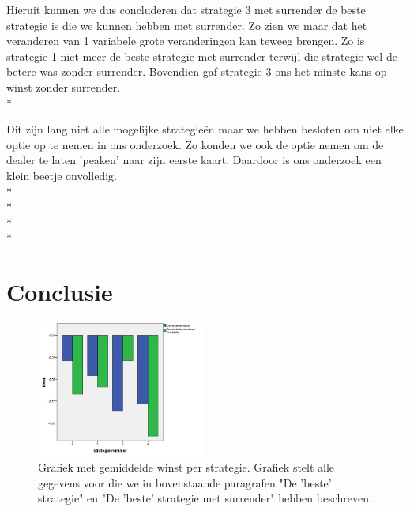 \documentclass[conference]{IEEEtran}
\begin{document}
Hieruit kunnen we dus concluderen dat strategie 3 met surrender de beste strategie is die we kunnen hebben met surrender. Zo zien we maar dat het veranderen van 1 variabele grote veranderingen kan teweeg brengen. Zo is strategie 1 niet meer de beste strategie met surrender terwijl die strategie wel de betere was zonder surrender. Bovendien gaf strategie 3 ons het minste kans op winst zonder surrender.\\*

Dit zijn lang niet alle mogelijke strategie\"en maar we hebben besloten om niet elke optie op te nemen in ons onderzoek. Zo konden we ook de optie nemen om de dealer te laten 'peaken' naar zijn eerste kaart. Daardoor is ons onderzoek een klein beetje onvolledig.\\*\\*\\*\\*


\section{Conclusie}

\begin{figure}[h!]
	\centering
		\includegraphics[width=0.5\textwidth]{GrafiekProfit.jpeg}
	\caption{Grafiek met gemiddelde winst per strategie.
	Grafiek stelt alle gegevens voor die we in bovenstaande paragrafen "De 'beste' strategie" en "De 'beste' strategie met surrender" hebben beschreven.}
	\label{fig:GrafiekProfit}
\end{figure}
\end{document}
